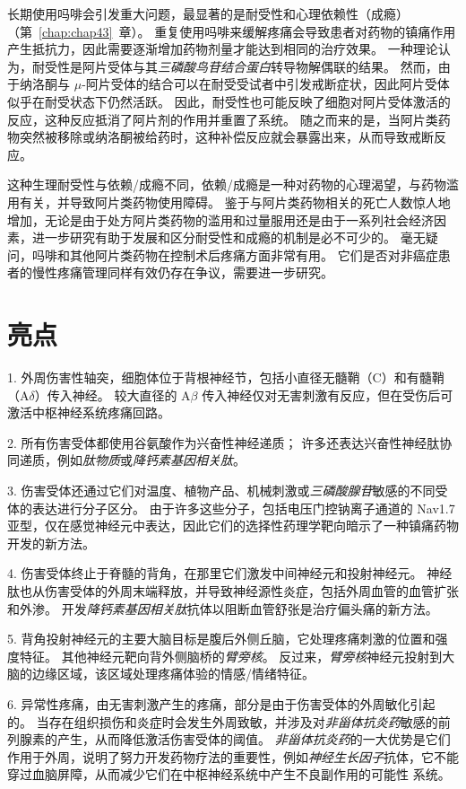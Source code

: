 长期使用吗啡会引发重大问题，最显著的是耐受性和心理依赖性（成瘾）（第~\ref{chap:chap43}~章）。
重复使用吗啡来缓解疼痛会导致患者对药物的镇痛作用产生抵抗力，因此需要逐渐增加药物剂量才能达到相同的治疗效果。
一种理论认为，耐受性是阿片受体与其\textit{三磷酸鸟苷结合蛋白}转导物解偶联的结果。
然而，由于纳洛酮与 $\mu$-阿片受体的结合可以在耐受受试者中引发戒断症状，因此阿片受体似乎在耐受状态下仍然活跃。
因此，耐受性也可能反映了细胞对阿片受体激活的反应，这种反应抵消了阿片剂的作用并重置了系统。
随之而来的是，当阿片类药物突然被移除或纳洛酮被给药时，这种补偿反应就会暴露出来，从而导致戒断反应。


这种生理耐受性与依赖/成瘾不同，依赖/成瘾是一种对药物的心理渴望，与药物滥用有关，并导致阿片类药物使用障碍。
鉴于与阿片类药物相关的死亡人数惊人地增加，无论是由于处方阿片类药物的滥用和过量服用还是由于一系列社会经济因素，进一步研究有助于发展和区分耐受性和成瘾的机制是必不可少的。
毫无疑问，吗啡和其他阿片类药物在控制术后疼痛方面非常有用。
它们是否对非癌症患者的慢性疼痛管理同样有效仍存在争议，需要进一步研究。



\section{亮点}

1. 外周伤害性轴突，细胞体位于背根神经节，包括小直径无髓鞘（C）和有髓鞘（A$\delta$）传入神经。
较大直径的 A$\beta$ 传入神经仅对无害刺激有反应，但在受伤后可激活中枢神经系统疼痛回路。 


2. 所有伤害受体都使用谷氨酸作为兴奋性神经递质； 许多还表达兴奋性神经肽协同递质，例如\textit{肽物质}或\textit{降钙素基因相关肽}。


3. 伤害受体还通过它们对温度、植物产品、机械刺激或\textit{三磷酸腺苷}敏感的不同受体的表达进行分子区分。
由于许多这些分子，包括电压门控钠离子通道的 Nav1.7 亚型，仅在感觉神经元中表达，因此它们的选择性药理学靶向暗示了一种镇痛药物开发的新方法。


4. 伤害受体终止于脊髓的背角，在那里它们激发中间神经元和投射神经元。
神经肽也从伤害受体的外周末端释放，并导致神经源性炎症，包括外周血管的血管扩张和外渗。
开发\textit{降钙素基因相关肽}抗体以阻断血管舒张是治疗偏头痛的新方法。 


5. 背角投射神经元的主要大脑目标是腹后外侧丘脑，它处理疼痛刺激的位置和强度特征。
其他神经元靶向背外侧脑桥的\textit{臂旁核}。
反过来，\textit{臂旁核}神经元投射到大脑的边缘区域，该区域处理疼痛体验的情感/情绪特征。
 

6. 异常性疼痛，由无害刺激产生的疼痛，部分是由于伤害受体的外周敏化引起的。
当存在组织损伤和炎症时会发生外周致敏，并涉及对\textit{非甾体抗炎药}敏感的前列腺素的产生，从而降低激活伤害受体的阈值。
\textit{非甾体抗炎药}的一大优势是它们作用于外周，说明了努力开发药物疗法的重要性，例如\textit{神经生长因子}抗体，它不能穿过血脑屏障，从而减少它们在中枢神经系统中产生不良副作用的可能性 系统。 


